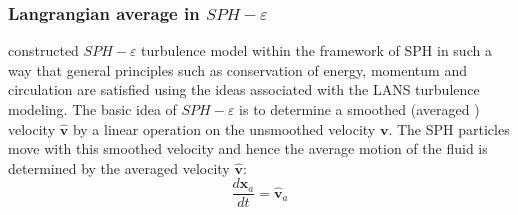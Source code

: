 \documentclass[gmd, manuscript]{copernicus} %
\providecommand{\DIFadd}[1]{{\protect\color{blue}\uwave{#1}}} %
\providecommand{\DIFaddbegin}{} %
\providecommand{\DIFaddend}{} %
\begin{document}
% 

\subsubsection{Langrangian average in $SPH-\varepsilon$}
\citet{monaghan2011turbulence} constructed $SPH-\varepsilon$ turbulence model within the framework of SPH in such a way that general principles such as conservation of energy, momentum and circulation are satisfied using the ideas associated with the LANS turbulence modeling. The basic idea of $SPH-\varepsilon$ is to determine a smoothed (averaged \DIFaddbegin \DIFadd{in space}\DIFaddend ) velocity $\widehat{\textbf{v}}$ by a linear operation on the unsmoothed velocity $\textbf{v}$. The SPH particles move with this smoothed velocity and hence the average motion of the fluid is determined by the averaged velocity $\widehat{\textbf{v}}$:
\begin{equation}
\dfrac{d \textbf{x}_a}{dt} = \widehat{\textbf{v}}_a \label{eq:gov-update-pos-turbulence}
\end{equation}
\end{document}
